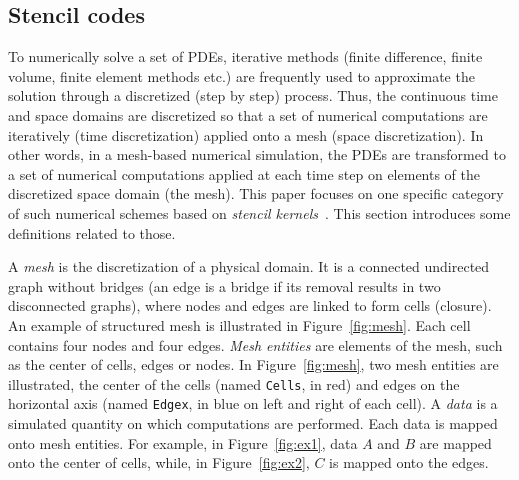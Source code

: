 \subsection{Stencil codes}
\label{sect:stencil}
To numerically solve a set of PDEs, iterative methods (finite difference, finite volume, finite element methods etc.) are frequently used to approximate the solution through a discretized (step by step) process. Thus, the continuous time and space domains are discretized so that a set of numerical computations are iteratively (time discretization) applied onto a mesh (space discretization). In other words, in a mesh-based numerical simulation, the PDEs are transformed to a set of numerical computations applied at each time step on elements of the discretized space domain (the mesh).
This paper focuses on one specific category of such numerical schemes based on \textit{stencil kernels}~\cite{spaaTangCKLL11}.
This section introduces some definitions related to those.

A \emph{mesh} is the discretization of a physical domain. It is a connected undirected graph without bridges (an edge is a bridge if its removal results in two disconnected graphs), where nodes and edges are linked to form cells (closure). An example of structured mesh is illustrated in Figure~\ref{fig:mesh}. Each cell contains four nodes and four edges. \emph{Mesh entities} are elements of the mesh, such as the center of cells, edges or nodes. In Figure~\ref{fig:mesh}, two mesh entities are illustrated, the center of the cells (named \texttt{Cells}, in red) and edges on the horizontal axis (named \texttt{Edgex}, in blue on left and right of each cell). A \emph{data} is a simulated quantity on which computations are performed. Each data is mapped onto mesh entities. For example, in Figure~\ref{fig:ex1}, data $A$ and $B$ are mapped onto the center of cells, while, in Figure~\ref{fig:ex2}, $C$ is mapped onto the edges.



